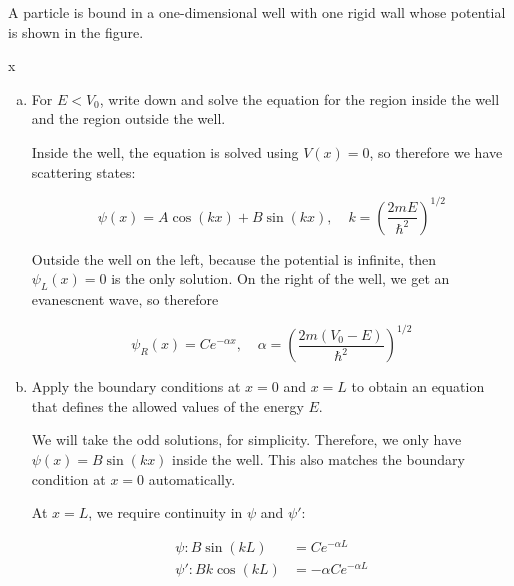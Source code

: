 \documentclass[10pt]{article}
\begin{document}
    A particle is bound in a one-dimensional well with one rigid wall whose potential is shown in the figure.


    \begin{center}
    \end{center}x

    \begin{enumerate}[(a)]
        \item For $E < V_0$, write down and solve the \schrodinger equation for the region inside the well and the region outside the well. 
        
        \begin{solution}
            Inside the well, the \schrodinger equation is solved using $V(x) = 0$, so therefore we have scattering states: 

            \[ \psi(x) = A \cos(kx) + B \sin (kx), \phantom{aa} k = \left(\frac{2mE}{\hbar^2}\right)^{1/2}\]

            Outside the well on the left, because the potential is infinite, then $\psi_L(x) = 0$ is the only solution. On the right of the well, we get an evanescnent wave, so therefore 

            \[ \psi_R(x) = Ce^{-\alpha x}, \phantom{aa} \alpha = \left(\frac{2m(V_0 - E)}{\hbar^2}\right)^{1/2}\]
        \end{solution}
        \item Apply the boundary conditions at $x=0$ and $x = L$ to obtain an equation that defines the allowed values of the energy $E$. 
        
        \begin{solution}
            We will take the odd solutions, for simplicity. Therefore, we only have $\psi(x) = B\sin (kx)$ inside the well. This also matches the boundary condition at $x = 0$ automatically. 

            At $x = L$, we require continuity in $\psi$ and $\psi'$: 

            \begin{align*}
                \psi: B\sin(kL) &= Ce^{-\alpha L}\\
                \psi': Bk \cos (kL) &= -\alpha Ce^{-\alpha L}
            \end{align*}
            

\end{solution}
\end{enumerate}
\end{document}
